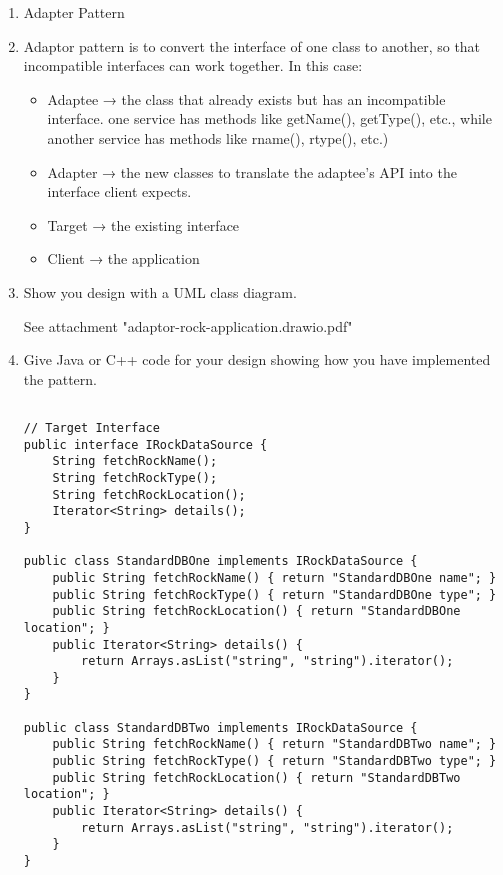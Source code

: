 \begin{enumerate}
    \item Adapter Pattern
    
    \item Adaptor pattern is to convert the interface of one class to another, so that incompatible interfaces can work together. In this case:

    \begin{itemize}
        \item Adaptee → the class that already exists but has an incompatible interface. one service has methods like getName(), getType(), etc., while another service has methods like rname(), rtype(), etc.)
        \item Adapter → the new classes to translate the adaptee’s API into the interface client expects.
       \item Target → the existing interface
        \item Client → the application
    \end{itemize}
    
    \item Show you design with a UML class diagram. 
    
    See attachment "adaptor-rock-application.drawio.pdf"
    
    
    \item Give Java or C++ code for your design showing how you have implemented the pattern. 

\begin{verbatim} 

// Target Interface
public interface IRockDataSource {
    String fetchRockName();
    String fetchRockType();
    String fetchRockLocation();
    Iterator<String> details();
}

public class StandardDBOne implements IRockDataSource {
    public String fetchRockName() { return "StandardDBOne name"; }
    public String fetchRockType() { return "StandardDBOne type"; }
    public String fetchRockLocation() { return "StandardDBOne location"; }
    public Iterator<String> details() {
        return Arrays.asList("string", "string").iterator();
    }
}

public class StandardDBTwo implements IRockDataSource {
    public String fetchRockName() { return "StandardDBTwo name"; }
    public String fetchRockType() { return "StandardDBTwo type"; }
    public String fetchRockLocation() { return "StandardDBTwo location"; }
    public Iterator<String> details() {
        return Arrays.asList("string", "string").iterator();
    }
}


\end{verbatim}
\end{enumerate}
